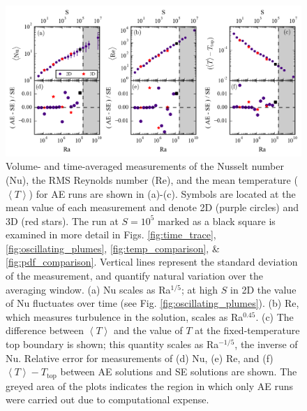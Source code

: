 \documentclass[aps, pre, onecolumn, nofootinbib, notitlepage, groupedaddress, amsfonts, amssymb, amsmath, longbibliography]{revtex4-1}
\newcommand{\angles}[1]{\ensuremath{\left\langle #1 \right\rangle}}
\begin{document}
\begin{figure}[b!]
\includegraphics[width=\textwidth]{./figs/parameter_space_comparison.png}
\caption{Volume- and time-averaged measurements of the Nusselt number (Nu), the
RMS Reynolds number (Re), and the mean temperature ($\angles{T}$) for AE runs are shown in (a)-(c).
Symbols are located at the mean value of
each measurement and denote 2D (purple circles) and 3D (red stars). 
The run at $S = 10^5$ marked as a
black square is examined in more detail in Figs. \ref{fig:time_trace}, \ref{fig:oscillating_plumes},
\ref{fig:temp_comparison}, \& \ref{fig:pdf_comparison}.
Vertical lines represent the standard deviation of the measurement,
and quantify natural variation over the averaging window. 
(a) Nu scales as Ra$^{1/5}$; at high $S$ in 2D the value of Nu fluctuates over time
(see Fig. \ref{fig:oscillating_plumes}).  
(b) Re, which measures turbulence in the solution, scales as
Ra$^{0.45}$. (c) The difference between $\angles{T}$ and the value of $T$ at the fixed-temperature
top boundary is shown; this quantity scales as Ra$^{-1/5}$, the inverse of Nu.
Relative error for measurements of (d) Nu, (e) Re, and (f) $\angles{T} - T_{\text{top}}$ between 
AE solutions and SE solutions are shown.
The greyed area of the plots indicates the region in which only AE runs were
carried out due to computational expense. \label{fig:parameter_space_comparison} }
\end{figure}
\end{document}
